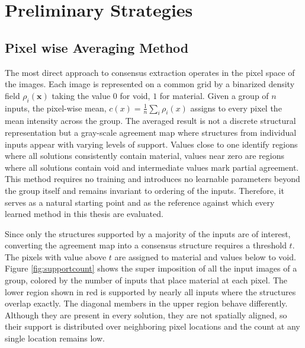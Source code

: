 \documentclass[
  numbers=noenddot,
  english,  %
  a4paper,  %
  twoside,  %
  bibliography=totoc,
  headsepline,
  cleardoublepage=empty,
  parskip=half,
  draft=false
]{scrbook}
\theoremstyle{break}
\begin{document}
\chapter{Preliminary Strategies}\label{sec:prelim_work}


\section{Pixel wise Averaging Method}\label{sec:pixelwiseavg}

The most direct approach to consensus extraction operates in the pixel space of the images. Each image is represented on a common grid by a binarized density field $\rho_i(\mathbf{x})$ taking the value $0$ for void, $1$ for material. Given a group of $n$ inputs, the pixel-wise mean, $c(x) = \frac{1}{n} \sum_{i} \rho_{i}(x)$ assigns to every pixel the mean intensity across the group. The averaged result is not a discrete structural representation but a gray-scale agreement map where structures from individual inputs appear with varying levels of support. Values close to one identify regions where all solutions consistently contain material, values near zero are regions where all solutions contain void and intermediate values mark partial agreement. This method requires no training and introduces no learnable parameters beyond the group itself and remains invariant to ordering of the inputs. Therefore, it serves as a natural starting point and as the reference against which every learned method in this thesis are evaluated.

Since only the structures supported by a majority of the inputs are of interest, converting the agreement map into a consensus structure requires a threshold $t$. The pixels with value above $t$ are assigned to material and values below to void. Figure \ref{fig:supportcount} shows the super imposition of all the input images of a group, colored by the number of inputs that place material at each pixel. The lower region shown in red is supported by nearly all inputs where the structures overlap exactly. The diagonal members in the upper region behave differently. Although they are present in every solution, they are not spatially aligned, so their support is distributed over neighboring pixel locations and the count at any single location remains low.
\end{document}
